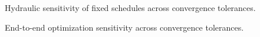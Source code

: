 \documentclass[11pt]{article}
\theoremstyle{remark}
\begin{document}
\begin{table}[htbp]
\centering
\caption{Hydraulic sensitivity of fixed schedules across convergence tolerances.}
\label{tab:accuracy_fixed}
\small

\end{table}

\begin{table}[htbp]
\centering
\caption{End-to-end optimization sensitivity across convergence tolerances.}
\label{tab:accuracy_optimization}
\small

\end{table}
\end{document}
